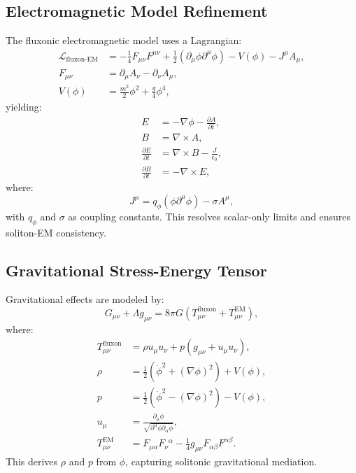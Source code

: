 \documentclass{article}
\begin{document}
\subsection{Electromagnetic Model Refinement}
The fluxonic electromagnetic model uses a Lagrangian:
\begin{align}
    \mathcal{L}_{\text{fluxon-EM}} &= -\frac{1}{4} F_{\mu\nu} F^{\mu\nu} + \frac{1}{2} (\partial_\mu \phi \partial^\mu \phi) - V(\phi) - J^\mu A_\mu, \\
    F_{\mu\nu} &= \partial_\mu A_\nu - \partial_\nu A_\mu, \\
    V(\phi) &= \frac{m^2}{2} \phi^2 + \frac{g}{4} \phi^4,
\end{align}
yielding:
\begin{align}
    E &= -\nabla \phi - \frac{\partial A}{\partial t}, \\
    B &= \nabla \times A, \\
    \frac{\partial E}{\partial t} &= \nabla \times B - \frac{J}{\epsilon_0}, \\
    \frac{\partial B}{\partial t} &= -\nabla \times E,
\end{align}
where:
\begin{equation}
    J^\mu = q_\phi (\phi \partial^\mu \phi) - \sigma A^\mu,
\end{equation}
with \( q_\phi \) and \(\sigma\) as coupling constants. This resolves scalar-only limits and ensures soliton-EM consistency.

\subsection{Gravitational Stress-Energy Tensor}
Gravitational effects are modeled by:
\begin{equation}
    G_{\mu\nu} + \Lambda g_{\mu\nu} = 8\pi G (T^{\text{fluxon}}_{\mu\nu} + T^{\text{EM}}_{\mu\nu}),
\end{equation}
where:
\begin{align}
    T^{\text{fluxon}}_{\mu\nu} &= \rho u_\mu u_\nu + p (g_{\mu\nu} + u_\mu u_\nu), \\
    \rho &= \frac{1}{2} (\dot{\phi}^2 + (\nabla \phi)^2) + V(\phi), \\
    p &= \frac{1}{2} (\dot{\phi}^2 - (\nabla \phi)^2) - V(\phi), \\
    u_\mu &= \frac{\partial_\mu \phi}{\sqrt{\partial^\alpha \phi \partial_\alpha \phi}}, \\
    T^{\text{EM}}_{\mu\nu} &= F_{\mu\alpha} F_\nu{}^\alpha - \frac{1}{4} g_{\mu\nu} F_{\alpha\beta} F^{\alpha\beta}.
\end{align}
This derives \(\rho\) and \(p\) from \(\phi\), capturing solitonic gravitational mediation.
\end{document}
